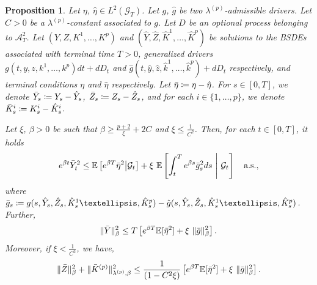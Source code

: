 \documentclass[10pt,a4paper]{amsart}
\newtheorem{proposition}{Proposition}
\begin{document}
\begin{proposition}\label{prop:PE}
    Let $\eta$, $\hat{\eta}\in L^2(\mathcal{G}_T)$. Let $g$, $\hat{g}$ be two $\lambda^{(p)}$-admissible drivers. Let $C>0$ be a $\lambda^{(p)}$-constant associated to $g$. Let $D$ be an optional process belonging to $\mathcal{A}_T^2$.
    Let $(Y,Z,K^1,\ldots,K^p)$ and $(\hat{Y}, \hat{Z}, \hat{K}^1,\ldots,\hat{K}^p)$ be  solutions to the BSDEs associated with terminal time $T>0$, generalized drivers $g(t,y,z,k^1,\ldots,k^p)dt + dD_t$ and $\hat{g}(t,\hat{y},\hat{z},\hat{k}^1,\ldots,\hat{k}^p) + dD_t$ respectively, and terminal conditions $\eta$ and $\hat{\eta}$ respectively.
    Let $\Bar{\eta}\coloneqq\eta - \hat{\eta}$.  For $s\in[0,T]$, we denote $\Bar{Y}_s\coloneqq Y_s - \hat{Y}_s$, $\Bar{Z}_s\coloneqq Z_s - \hat{Z}_s$, and for each $i\in\{1,\ldots,p\}$, we denote $\Bar{K}_s^i\coloneqq K_s^i - \hat{K}_s^i$.

    Let $\xi$, $\beta>0$ be such that $\beta\ge\frac{p+2}{\xi}+2C$ and $\xi\le\frac{1}{C^2}$. Then, for each $t\in[0,T]$, it holds
    \begin{equation}\label{eq:peProp1}
        e^{\beta t}\Bar{Y}_t^2 \le \mathbb{E}\left[e^{\beta T}\Bar{\eta}^2\middle|\mathcal{G}_t\right] + \xi\text{ }\mathbb{E}\left[\int_t^Te^{\beta s}\Bar{g}_s^2ds\text{ }\middle|\text{ }\mathcal{G}_t\right]\quad\text{a.s.},
    \end{equation}
    where $\Bar{g}_s\coloneqq g(s,\hat{Y}_s,\hat{Z}_s,\hat{K}_s^1\ldots,\hat{K}_s^p) - \hat{g}(s,\hat{Y}_s,\hat{Z}_s,\hat{K}_s^1\ldots,\hat{K}_s^p)$. Further,
    \begin{equation}\label{eq:peProp2}
        \|\Bar{Y}\|_\beta^2\le T\left[e^{\beta T}\mathbb{E}[\Bar{\eta}^2] + \xi\text{ }\|\Bar{g}\|_\beta^2\right].
    \end{equation}
    Moreover, if $\xi < \frac{1}{C^2}$, we have,
    \begin{equation}\label{eq:peProp3}
        \|\Bar{Z}\|_\beta^2 + \|\Bar{K}^{(p)}\|_{\lambda^{(p)},\beta}^2 \le \frac{1}{(1-C^2\xi)}\left[e^{\beta T}\mathbb{E}[\Bar{\eta}^2] + \xi\text{ }\|\Bar{    g}\|_\beta^2\right].
    \end{equation}
\end{proposition}
\end{document}
